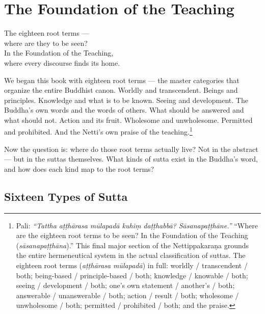 \chapter{The Foundation of the Teaching}
\label{ch:foundation}

\begin{versebox}
The eighteen root terms ---\\
where are they to be seen?\\
In the Foundation of the Teaching,\\
where every discourse finds its home.
\end{versebox}

\noindent We began this book with eighteen root terms --- the master categories that organize the entire Buddhist canon. Worldly and transcendent. Beings and principles. Knowledge and what is to be known. Seeing and development. The Buddha's own words and the words of others. What should be answered and what should not. Action and its fruit. Wholesome and unwholesome. Permitted and prohibited. And the Netti's own praise of the teaching.\footnote{Pali: \textit{``Tattha aṭṭhārasa mūlapadā kuhiṃ daṭṭhabbā? Sāsanapaṭṭhāne.''} ``Where are the eighteen root terms to be seen? In the Foundation of the Teaching (\textit{sāsanapaṭṭhāna}).'' This final major section of the Nettippakaraṇa grounds the entire hermeneutical system in the actual classification of suttas. The eighteen root terms (\textit{aṭṭhārasa mūlapadā}) in full: worldly / transcendent / both; being-based / principle-based / both; knowledge / knowable / both; seeing / development / both; one's own statement / another's / both; answerable / unanswerable / both; action / result / both; wholesome / unwholesome / both; permitted / prohibited / both; and the praise.}

Now the question is: where do those root terms actually live? Not in the abstract --- but in the suttas themselves. What kinds of sutta exist in the Buddha's word, and how does each kind map to the root terms?

\section*{Sixteen Types of Sutta}

